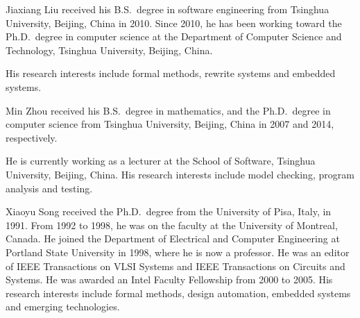 \documentclass[journal]{IEEEtranTIE}
\begin{document}

\begin{IEEEbiography}%
{Jiaxiang Liu} received his B.S.\ degree in software engineering from
Tsinghua University, Beijing, China in 2010. Since 2010, he has been
working toward the Ph.D.\ degree in computer science at the Department
of Computer Science and Technology, Tsinghua University, Beijing,
China.

His research interests include formal methods, rewrite systems and
embedded systems.
\end{IEEEbiography}

\vspace{-5mm}
\begin{IEEEbiography}%
{Min Zhou} received his B.S.\ degree in mathematics, and the
Ph.D.\ degree in computer science from Tsinghua University, Beijing,
China in 2007 and 2014, respectively.

He is currently working as a lecturer at the School of Software,
Tsinghua University, Beijing, China. His research interests include
model checking, program analysis and testing.
\end{IEEEbiography}

\vspace{-5mm}
\begin{IEEEbiography}%
{Xiaoyu Song} received the Ph.D.\ degree from the University of Pisa,
Italy, in 1991. From 1992 to 1998, he was on the faculty at the
University of Montreal, Canada. He joined the Department of Electrical
and Computer Engineering at Portland State University in 1998, where
he is now a professor. He was an editor of IEEE Transactions on VLSI
Systems and IEEE Transactions on Circuits and Systems. He was awarded
an Intel Faculty Fellowship from 2000 to 2005. His research interests
include formal methods, design automation, embedded systems and
emerging technologies.
\end{IEEEbiography}
\end{document}
